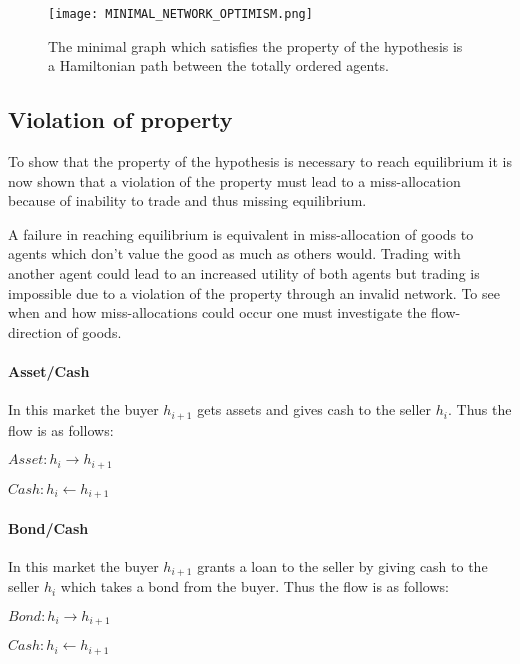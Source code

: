 \documentclass[Bachelorarbeit.tex]{subfiles}
\begin{document}
\begin{figure}[H]
	\centering
  \texttt{[image: MINIMAL\_NETWORK\_OPTIMISM.png]}
  	\caption{The minimal graph which satisfies the property of the hypothesis is a Hamiltonian path between the totally ordered agents.}
	\label{fig:MATCHING_BUYER_SELLER_RANGES}
\end{figure}

\subsection{Violation of property}
To show that the property of the hypothesis is necessary to reach equilibrium it is now shown that a violation of the property must lead to a miss-allocation because of inability to trade and thus missing equilibrium.

\medskip

A failure in reaching equilibrium is equivalent in miss-allocation of goods to agents which don't value the good as much as others would. Trading with another agent could lead to an increased utility of both agents but trading is impossible due to a violation of the property through an invalid network. To see when and how miss-allocations could occur one must investigate the flow-direction of goods.

\paragraph{Asset/Cash} In this market the buyer $h_{i+1}$ gets assets and gives cash to the seller $h_i$. Thus the flow is as follows:
\begin{center}
$Asset: h_i \to h_{i+1}$
\end{center}
\begin{center}
$Cash: h_i \gets h_{i+1}$
\end{center}

\paragraph{Bond/Cash} In this market the buyer $h_{i+1}$ grants a loan to the seller by giving cash to the seller $h_i$ which takes a bond from the buyer. Thus the flow is as follows:
\begin{center}
$Bond: h_i \to h_{i+1}$
\end{center}
\begin{center}
$Cash: h_i \gets h_{i+1}$
\end{center}
\end{document}
